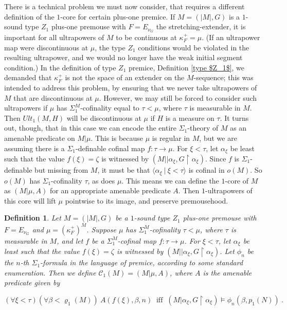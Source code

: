 \documentclass[12pt]{article}
\newtheorem{defn}[thm]{Definition}
\begin{document}
\bigskip

There is a technical problem we must now consider, that requires a different definition of the $1$-core for certain plus-one premice.  If $M = ( |M| , G)$ is a $1$-sound type $Z_1$ plus-one premouse with $F = E_{\nu_G}$ the stretching-extender, it is important for all ultrapowers of $M$ to be continuous at $\kappa_F^+ = \mu$.  (If an ultrapower map were discontinuous at $\mu$, the type $Z_1$ conditions would be violated in the resulting ultrapower, and we would no longer have the weak initial segment condition.)  In the definition of type $Z_1$ premice, Definition \ref{type $Z_1$}, we demanded that $\kappa_F^+$ is not the space of an extender on the $M$-sequence; this was intended to address this problem, by ensuring that we never take ultrapowers of $M$ that are discontinuous at $\mu$.  However, we may still be forced to consider such ultrapowers if $\mu$ has $\Sigma_1^M$-cofinality equal to $\tau < \mu$, where $\tau$ is measurable in $M$.  Then $Ult_1 (M , H)$ will be discontinuous at $\mu$ if $H$ is a measure on $\tau$.  It turns out, though, that in this case we can encode the entire $\Sigma_1$-theory of $M$ as an amenable predicate on $M | \mu$.  This is because $\mu$ is regular in $M$, but we are assuming there is a $\Sigma_1$-definable cofinal map $f: \tau \longrightarrow \mu$.  For $\xi < \tau$, let $\alpha_\xi$ be least such that the value $f(\xi) = \zeta$ is witnessed by $(M|| \alpha_\xi , G \restriction \alpha_\xi)$.  Since $f$ is $\Sigma_1$-definable but missing from $M$, it must be that $\langle \alpha_\xi \ | \ \xi < \tau \rangle$ is cofinal in $o(M)$.  So $o(M)$ has $\Sigma_1$-cofinality $\tau$, as does $\mu$.  This means we can define the $1$-core of $M$ as $(M | \mu , A)$ for an appropriate amenable predicate $A$.  Then $1$-ultrapowers of this core will lift $\mu$ pointwise to its image, and preserve premousehood.\\


\begin{defn} \label{alternate 1-core}
Let $M = ( |M| , G)$ be a $1$-sound type $Z_1$ plus-one premouse with $F = E_{\nu_G}$ and $\mu = (\kappa_F^+)^M$.  Suppose $\mu$ has $\Sigma_1^M$-cofinality $\tau < \mu$, where $\tau$ is measurable in $M$, and let $f$ be a $\Sigma_1^M$-cofinal map $f : \tau \longrightarrow \mu$.  For $\xi < \tau$, let $\alpha_\xi$ be least such that the value $f(\xi) = \zeta$ is witnessed by $(M|| \alpha_\xi , G \restriction \alpha_\xi)$.  Let $\phi_n$ be the $n$-th $\Sigma_1$-formula in the language of premice, according to some standard enumeration.  Then we define $\mathcal{C}_1 (M) = ( M | \mu , A)$, where $A$ is the amenable predicate given by

\[
( \forall \xi < \tau )(\forall \beta < \varrho_1 (M)) \ A ( f (\xi) , \beta , n) \ \text{ iff } \ (M | \alpha_\xi , G \restriction \alpha_\xi ) \models \phi_n ( \beta , p_1(N)) \ .
\]
\end{defn}
\end{document}
